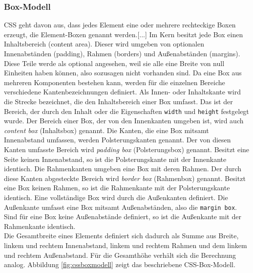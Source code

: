 \subsubsection{Box-Modell} \glqq CSS geht davon aus, dass jedes Element eine oder mehrere rechteckige Boxen erzeugt, die Element-Boxen genannt werden.[...] Im Kern besitzt jede Box einen Inhaltsbereich (content area). Dieser wird umgeben von optionalen Innenabständen (padding), Rahmen (borders) und Außenabständen (margins). Diese Teile werde als optional angesehen, weil sie alle eine Breite von null Einheiten haben können, also sozusagen nicht vorhanden sind.\grqq{}\cite[S.167]{MeyeCasc2005} \glqq Da eine Box aus mehreren Komponenten bestehen kann, werden für die einzelnen Bereiche verschiedene Kantenbezeichnungen definiert. Als Innen- oder Inhaltskante wird die Strecke bezeichnet, die den Inhaltsbereich einer Box umfasst. Das ist der Bereich, der durch den Inhalt oder die Eigenschaften \texttt{width} und \texttt{height} festgelegt wurde. Der Bereich einer Box, der von den Innenkanten umgeben ist, wird auch \textit{content box} (Inhaltsbox) genannt. Die Kanten, die eine Box mitsamt Innenabstand umfassen, werden Polsterungskanten genannt. Der von diesen Kanten umfasste Bereich wird \textit{padding box} (Polsterungsbox) genannt. Besitzt eine Seite keinen Innenabstand, so ist die Polsterungskante mit der Innenkante identisch. Die Rahmenkanten umgeben eine Box mit deren Rahmen. Der durch diese Kanten abgesteckte Bereich wird \textit{border box} (Rahmenbox) genannt. Besitzt eine Box keinen Rahmen, so ist die Rahmenkante mit der Polsterungskante identisch. Eine vollständige Box wird durch die Außenkanten definiert. Die Außenkante umfasst eine Box mitsamt Außenabständen, also die \texttt{margin box}. Sind für eine Box keine Außenabstände definiert, so ist die Außenkante mit der Rahmenkante identisch.\grqq{}\cite{SelfHtml20145}\\Die Gesamtbreite eines Elements definiert sich dadurch als Summe aus Breite, linkem und rechtem Innenabstand, linkem und rechtem Rahmen und dem linkem und rechtem Außenabstand. Für die Gesamthöhe verhält sich die Berechnung analog. Abbildung \ref{fig:cssboxmodell} zeigt das beschriebene CSS-Box-Modell.

